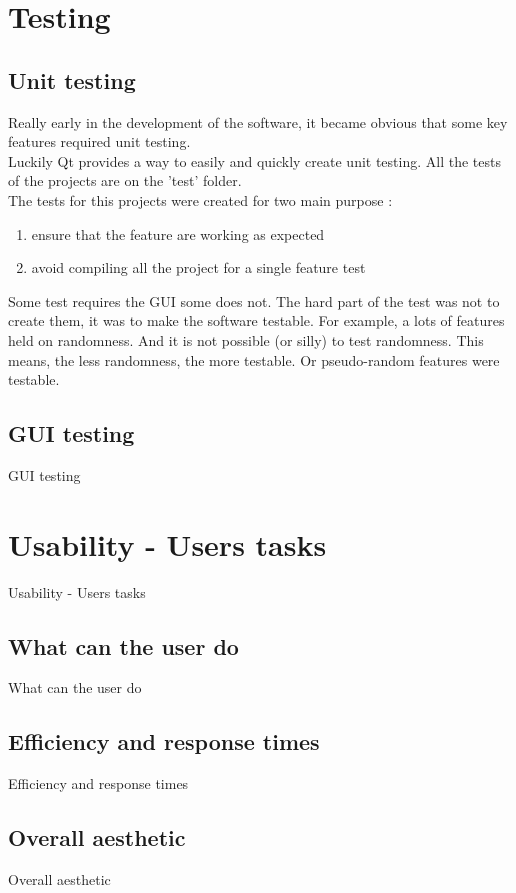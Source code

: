 \part{Testing}

\chapter{Unit testing}
Really early in the development of the software, it became obvious that some key features required unit testing.\\
Luckily Qt provides a way to easily and quickly create unit testing. All the tests of the projects are on the 'test' folder.\\
The tests for this projects were created for two main purpose :
\begin{enumerate}
	\item ensure that the feature are working as expected
	\item avoid compiling all the project for a single feature test
\end{enumerate}
Some test requires the GUI some does not. The hard part of the test was not to create them, it was to make the software testable. For example, a lots of features held on randomness. And it is not possible (or silly) to test randomness. This means, the less randomness, the more testable. Or pseudo-random features were testable.

\chapter{GUI testing}
GUI testing

\part{Usability - Users tasks}
Usability - Users tasks

\chapter{What can the user do}
What can the user do


\chapter{Efficiency and response times}
Efficiency and response times

\chapter{Overall aesthetic}
Overall aesthetic

